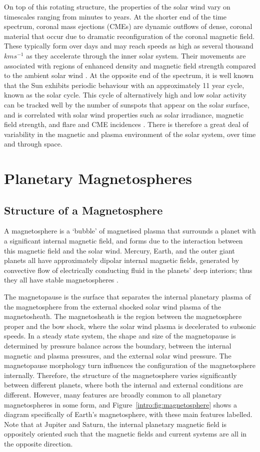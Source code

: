 On top of this rotating structure, the properties of the solar wind vary on timescales ranging from minutes to years. At the shorter end of the time spectrum, coronal mass ejections (CMEs) are dynamic outflows of dense, coronal material that occur due to dramatic reconfiguration of the coronal magnetic field. These typically form over days and may reach speeds as high as several thousand $\si{km s^{-1}}$ as they accelerate through the inner solar system. Their movements are associated with regions of enhanced density and magnetic field strength compared to the ambient solar wind \citep{odstrcil1999}. At the opposite end of the spectrum, it is well known that the Sun exhibits periodic behaviour with an approximately 11 year cycle, known as the solar cycle. This cycle of alternatively high and low solar activity can be tracked well by the number of sunspots that appear on the solar surface, and is correlated with solar wind properties such as solar irradiance, magnetic field strength, and flare and CME incidences \citep{hathaway2015}. There is therefore a great deal of variability in the magnetic and plasma environment of the solar system, over time and through space.

\section{Planetary Magnetospheres}
\subsection{Structure of a Magnetosphere}
A magnetosphere is a `bubble' of magnetised plasma that surrounds a planet with a significant internal magnetic field, and forms due to the interaction between this magnetic field and the solar wind. Mercury, Earth, and the outer giant planets all have approximately dipolar internal magnetic fields, generated by convective flow of electrically conducting fluid in the planets' deep interiors; thus they all have stable magnetospheres \citep{kivelson2014book}.

The magnetopause is the surface that separates the internal planetary plasma of the magnetosphere from the external shocked solar wind plasma of the magnetosheath. The magnetosheath is the region between the magnetosphere proper and the bow shock, where the solar wind plasma is decelerated to subsonic speeds. In a steady state system, the shape and size of the magnetopause is determined by pressure balance across the boundary, between the internal magnetic and plasma pressures, and the external solar wind pressure. The magnetopause morphology turn influences the configuration of the magnetosphere internally. Therefore, the structure of the magnetosphere varies significantly between different planets, where both the internal and external conditions are different. However, many features are broadly common to all planetary magnetospheres in some form, and Figure~\ref{intro:fig:magnetosphere} shows a diagram specifically of Earth's magnetosphere, with these main features labelled. Note that at Jupiter and Saturn, the internal planetary magnetic field is oppositely oriented such that the magnetic fields and current systems are all in the opposite direction.


